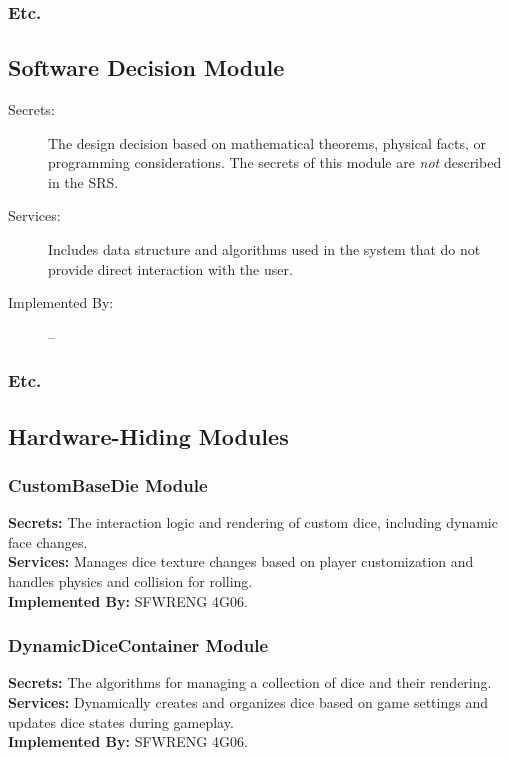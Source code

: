 \documentclass[12pt, titlepage]{article}
\begin{document}
\subsubsection{Etc.}


\subsection{Software Decision Module}

\begin{description}
\item[Secrets:] The design decision based on mathematical theorems, physical
  facts, or programming considerations. The secrets of this module are
  \emph{not} described in the SRS.
\item[Services:] Includes data structure and algorithms used in the system that
  do not provide direct interaction with the user. 
\item[Implemented By:] --
\end{description}

\subsubsection{Etc.}

\subsection{Hardware-Hiding Modules}
\subsubsection{CustomBaseDie Module}
\textbf{Secrets:} The interaction logic and rendering of custom dice, including dynamic face changes.\\
\textbf{Services:} Manages dice texture changes based on player customization and handles physics and collision for rolling.\\
\textbf{Implemented By:} SFWRENG 4G06.

\subsubsection{DynamicDiceContainer Module}
\textbf{Secrets:} The algorithms for managing a collection of dice and their rendering.\\
\textbf{Services:} Dynamically creates and organizes dice based on game settings and updates dice states during gameplay.\\
\textbf{Implemented By:} SFWRENG 4G06.
\end{document}
